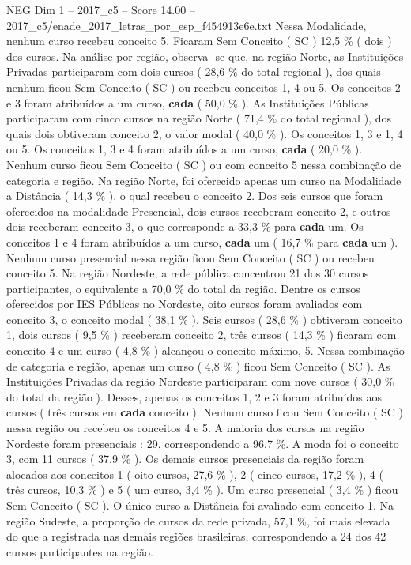 \begin{textsample}{NEG Dim 1 – 2017\_c5 – Score 14.00 – 2017\_c5/enade\_2017\_letras\_por\_esp\_f454913e6e.txt}
Nessa Modalidade, nenhum curso recebeu conceito 5.
Ficaram Sem Conceito ( SC ) 12,5 \% ( dois ) dos cursos.
Na análise por região, observa -se que, na região Norte, as Instituições Privadas participaram com dois cursos ( 28,6 \% do total regional ), dos quais nenhum ficou Sem Conceito ( SC ) ou recebeu conceitos 1, 4 ou 5.
Os conceitos 2 e 3 foram atribuídos a um curso, \textbf{cada} ( 50,0 \% ).
As Instituições Públicas participaram com cinco cursos na região Norte ( 71,4 \% do total regional ), dos quais dois obtiveram conceito 2, o valor modal ( 40,0 \% ).
Os conceitos 1, 3 e 1, 4 ou 5.
Os conceitos 1, 3 e 4 foram atribuídos a um curso, \textbf{cada} ( 20,0 \% ).
Nenhum curso ficou Sem Conceito ( SC ) ou com conceito 5 nessa combinação de categoria e região.
Na região Norte, foi oferecido apenas um curso na Modalidade a Distância ( 14,3 \% ), o qual recebeu o conceito 2.
Dos seis cursos que foram oferecidos na modalidade Presencial, dois cursos receberam conceito 2, e outros dois receberam conceito 3, o que corresponde a 33,3 \% para \textbf{cada} um.
Os conceitos 1 e 4 foram atribuídos a um curso, \textbf{cada} um ( 16,7 \% para \textbf{cada} um ).
Nenhum curso presencial nessa região ficou Sem Conceito ( SC ) ou recebeu conceito 5.
Na região Nordeste, a rede pública concentrou 21 dos 30 cursos participantes, o equivalente a 70,0 \% do total da região.
Dentre os cursos oferecidos por IES Públicas no Nordeste, oito cursos foram avaliados com conceito 3, o conceito modal ( 38,1 \% ).
Seis cursos ( 28,6 \% ) obtiveram conceito 1, dois cursos ( 9,5 \% ) receberam conceito 2, três cursos ( 14,3 \% ) ficaram com conceito 4 e um curso ( 4,8 \% ) alcançou o conceito máximo, 5.
Nessa combinação de categoria e região, apenas um curso ( 4,8 \% ) ficou Sem Conceito ( SC ).
As Instituições Privadas da região Nordeste participaram com nove cursos ( 30,0 \% do total da região ).
Desses, apenas os conceitos 1, 2 e 3 foram atribuídos aos cursos ( três cursos em \textbf{cada} conceito ).
Nenhum curso ficou Sem Conceito ( SC ) nessa região ou recebeu os conceitos 4 e 5.
A maioria dos cursos na região Nordeste foram presenciais : 29, correspondendo a 96,7 \%.
A moda foi o conceito 3, com 11 cursos ( 37,9 \% ).
Os demais cursos presenciais da região foram alocados aos conceitos 1 ( oito cursos, 27,6 \% ), 2 ( cinco cursos, 17,2 \% ), 4 ( três cursos, 10,3 \% ) e 5 ( um curso, 3,4 \% ).
Um curso presencial ( 3,4 \% ) ficou Sem Conceito ( SC ).
O único curso a Distância foi avaliado com conceito 1.
Na região Sudeste, a proporção de cursos da rede privada, 57,1 \%, foi mais elevada do que a registrada nas demais regiões brasileiras, correspondendo a 24 dos 42 cursos participantes na região.

\end{textsample}
